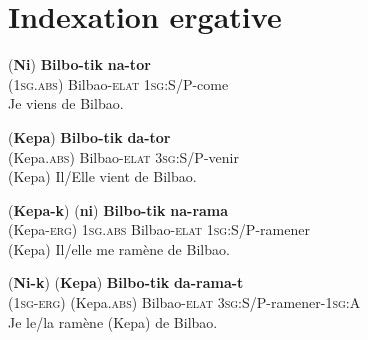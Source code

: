 \documentclass[oldfontcommands,twoside,a4paper,12pt]{article}
\newcommand{\ipa}[1]{{\phon\textbf{#1}}}
\begin{document}
 \section{Indexation ergative}
%



\begin{exe}
\ex 
\label{ex:1a}
\gll (\ipa{Ni}) \ipa{Bilbo-tik} \ipa{na-tor}\\
(\textsc{1sg.abs}) {Bilbao-\textsc{elat}} {\textsc{1sg}:S/P-come}\\ %
\trans Je viens de Bilbao.
\end{exe}

\begin{exe}
\ex 
\label{ex:1a}
\gll (\ipa{Kepa}) \ipa{Bilbo-tik} \ipa{da-tor}\\
(Kepa.\textsc{abs}) {Bilbao-\textsc{elat}} {\textsc{3sg}:S/P-venir}\\ %
\trans (Kepa) Il/Elle vient de Bilbao.
\end{exe}


\begin{exe}
\ex 
\label{ex:1a}
\gll (\ipa{Kepa-k}) (\ipa{ni}) \ipa{Bilbo-tik} \ipa{na-rama}\\
(Kepa-\textsc{erg}) {\textsc{1sg.abs}} {Bilbao-\textsc{elat}} {\textsc{1sg}:S/P-ramener}\\ %
\trans (Kepa) Il/elle me ramène de Bilbao.
\end{exe}

\begin{exe}
\ex 
\label{ex:1a}
\gll (\ipa{Ni-k}) (\ipa{Kepa}) \ipa{Bilbo-tik} \ipa{da-rama-t}\\
({\textsc{1sg-erg}}) (Kepa.\textsc{abs}) {Bilbao-\textsc{elat}} {\textsc{3sg}:S/P-ramener-\textsc{1sg:A}}\\ %
\trans Je le/la ramène (Kepa) de Bilbao.
\end{exe}
\end{document}
